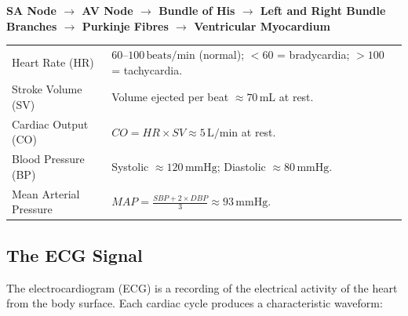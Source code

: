 \documentclass[12pt,a4paper]{article}
\renewcommand{\arraystretch}{1.45}
\begin{document}
\textbf{SA Node $\to$ AV Node $\to$ Bundle of His $\to$ Left and Right Bundle Branches $\to$ Purkinje Fibres $\to$ Ventricular Myocardium}

\begin{tcolorbox}[formulabox, title={\textbf{Cardiovascular Parameters and Normal Values}}]
\renewcommand{\arraystretch}{1.3}
\begin{tabularx}{\linewidth}{B{3.8cm} X}
Heart Rate (HR) & $60$--$100\,\text{beats/min}$ (normal); $< 60$ = bradycardia; $> 100$ = tachycardia. \\[4pt]
Stroke Volume (SV) & Volume ejected per beat $\approx 70\,\text{mL}$ at rest. \\[4pt]
Cardiac Output (CO) & $CO = HR \times SV \approx 5\,\text{L/min}$ at rest. \\[4pt]
Blood Pressure (BP) & Systolic $\approx 120\,\text{mmHg}$; Diastolic $\approx 80\,\text{mmHg}$. \\[4pt]
Mean Arterial Pressure & $MAP = \displaystyle\frac{SBP + 2 \times DBP}{3} \approx 93\,\text{mmHg}$.
\end{tabularx}
\end{tcolorbox}

\subsection{The ECG Signal}

The electrocardiogram (ECG) is a recording of the electrical activity of the heart from the body surface. Each cardiac cycle produces a characteristic waveform:
\end{document}
